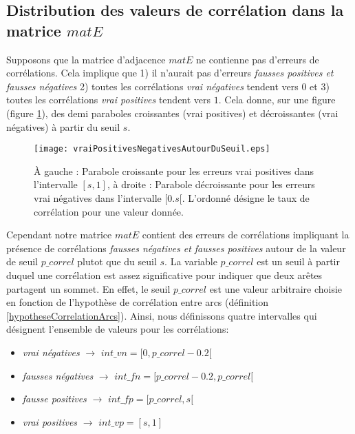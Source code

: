\documentclass[onecolumn, 12pt]{book}
\begin{document}
\subsection{Distribution des valeurs de corr\'elation dans la matrice $matE$}
Supposons que la matrice d'adjacence $matE$ ne contienne pas d'erreurs de corr\'elations. Cela implique que 1) il n'aurait pas d'erreurs {\em fausses positives et fausses n\'egatives} 2) toutes les corr\'elations {\em vrai n\'egatives} tendent vers $0$ et 3) toutes les corr\'elations {\em vrai positives} tendent vers $1$. Cela donne, sur une figure (figure \ref{vraiPositivesNegativesAutourDuSeuil}), des demi paraboles croissantes (vrai positives) et d\'ecroissantes (vrai n\'egatives) \`a partir du seuil $s$. 
\begin{figure}[htb!] 
\centering
\texttt{[image: vraiPositivesNegativesAutourDuSeuil.eps]}
\caption{\`A gauche : Parabole croissante pour les erreurs {vrai positives} dans l'intervalle  $[s,1]$, \`a droite : Parabole d\'ecroissante pour les erreurs {vrai n\'egatives} dans l'intervalle $[0.s[$. L'ordonn\'e d\'esigne le taux de corr\'elation pour une valeur donn\'ee. }
\label{vraiPositivesNegativesAutourDuSeuil} 
\end{figure}
Cependant notre matrice $matE$ contient des erreurs de corr\'elations impliquant la pr\'esence de corr\'elations {\em fausses n\'egatives et fausses positives} autour de la valeur de seuil $p\_correl$ plutot que du seuil $s$. La variable $p\_correl$ est un seuil \`a partir duquel une corr\'elation est assez significative pour indiquer que deux ar\^etes partagent un sommet. En effet, le seuil $p\_correl$ est une valeur arbitraire choisie en fonction de l'hypoth\`ese de corr\'elation entre arcs (d\'efinition \ref{hypotheseCorrelationArcs}). 
\newline 
Ainsi, nous d\'efinissons quatre intervalles qui d\'esignent l'ensemble de valeurs pour les corr\'elations: 
\begin{itemize}
\item {\em vrai n\'egatives} $\rightarrow$ $int\_vn = [0, p\_correl - 0.2[$
\item {\em fausses n\'egatives} $\rightarrow$ $int\_fn = [p\_correl - 0.2, p\_correl[$
\item {\em fausse positives} $\rightarrow$ $int\_fp = [p\_correl, s[$
\item {\em vrai positives} $\rightarrow$ $int\_vp = [s, 1]$
\end{itemize}
\end{document}
